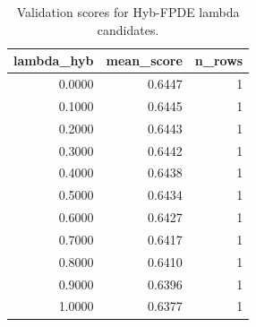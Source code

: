 \begin{table}[t]
\caption{Validation scores for Hyb-FPDE lambda candidates.}
\label{tab:lambda_distribution_computed}
\centering
\begin{tabular}{rrr}
\toprule
lambda\_hyb & mean\_score & n\_rows \\
\midrule
0.0000 & 0.6447 & 1 \\
0.1000 & 0.6445 & 1 \\
0.2000 & 0.6443 & 1 \\
0.3000 & 0.6442 & 1 \\
0.4000 & 0.6438 & 1 \\
0.5000 & 0.6434 & 1 \\
0.6000 & 0.6427 & 1 \\
0.7000 & 0.6417 & 1 \\
0.8000 & 0.6410 & 1 \\
0.9000 & 0.6396 & 1 \\
1.0000 & 0.6377 & 1 \\
\bottomrule
\end{tabular}

\end{table}
